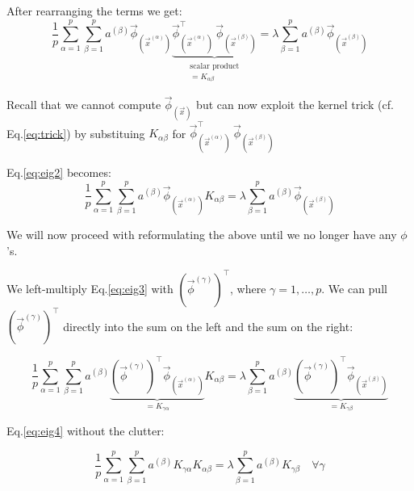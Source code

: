 \begin{enumerate}
After rearranging the terms we get:
\begin{equation} \label{eq:eig2}
\frac{1}{p} \sum_{\alpha=1}^{p} \sum^{p}_{\beta=1} 
a^{(\beta)} \vec{\phi}_{(\vec{x}^{(\alpha)})}
\underbrace{
 \vec{\phi}^{\top}_{(\vec{x}^{(\alpha)})} \,  \vec{\phi}_{(\vec{x}^{(\beta)})}
}_{\substack{\text{scalar product}\\ = K_{\alpha\beta}}}
 = \lambda 
\sum^{p}_{\beta=1} a^{(\beta)} \vec{\phi}_{(\vec{x}^{(\beta)})}
\end{equation}

Recall that we cannot compute $\vec{\phi}_{(\vec{x})}$ but can now 
exploit the kernel trick (cf. Eq.\ref{eq:trick}) by substituing 
$ K_{\alpha \beta} $ for
$
\vec{\phi}^{\top}_{(\vec{x}^{(\alpha)})}
 \, 
  \vec{\phi}_{(\vec{x}^{(\beta)})}
$

Eq.\ref{eq:eig2} becomes:
\begin{equation} \label{eq:eig3}
\frac{1}{p} \sum_{\alpha=1}^{p} \sum^{p}_{\beta=1} 
a^{(\beta)}
\vec{\phi}_{(\vec{x}^{(\alpha)})} K_{\alpha \beta}
 = \lambda 
\sum^{p}_{\beta=1} a^{(\beta)} \vec{\phi}_{(\vec{x}^{(\beta)})}
\end{equation}

We will now proceed with reformulating the above until we no longer have any $\phi$'s.

We left-multiply Eq.\ref{eq:eig3} with $\left(\vec \phi^{(\gamma)}\right)^\top$, where $\gamma = 1, \ldots, p$.
 We can pull $\left(\vec \phi^{(\gamma)}\right)^\top$ directly into the sum on the left and the sum on the right:

\begin{equation} \label{eq:eig4}
\frac{1}{p} \sum_{\alpha=1}^{p} \sum^{p}_{\beta=1} 
a^{(\beta)}
\underbrace{
\left(\vec \phi^{(\gamma)}\right)^\top
\vec{\phi}_{(\vec{x}^{(\alpha)})} 
}_{=K_{\gamma \alpha}}
K_{\alpha \beta}
 = \lambda 
\sum^{p}_{\beta=1} a^{(\beta)} 
\underbrace{
\left(\vec \phi^{(\gamma)}\right)^\top \vec{\phi}_{(\vec{x}^{(\beta)})}
}_{=K_{\gamma \beta}}
\end{equation}

\newpage

Eq.\ref{eq:eig4} without the clutter:

\begin{equation} \label{eq:eigK}
\frac{1}{p} \sum_{\alpha=1}^{p} \sum^{p}_{\beta=1} 
a^{(\beta)}
K_{\gamma \alpha}
K_{\alpha \beta}
 = \lambda 
\sum^{p}_{\beta=1} a^{(\beta)} 
K_{\gamma \beta} \quad \forall \gamma
\end{equation}


\end{enumerate}
